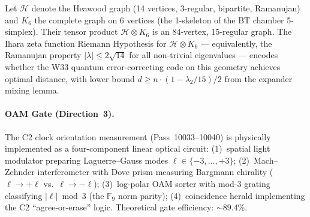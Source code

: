 \begin{theorem}
\label{thm:ihara_heawood_bt}
Let $\mathcal{H}$ denote the Heawood graph (14 vertices, 3-regular, bipartite,
Ramanujan) and $K_6$ the complete graph on 6 vertices
(the 1-skeleton of the BT chamber 5-simplex).
Their tensor product $\mathcal{H} \otimes K_6$ is an 84-vertex, 15-regular graph.
The Ihara zeta function Riemann Hypothesis for $\mathcal{H} \otimes K_6$
--- equivalently, the Ramanujan property $|\lambda| \leq 2\sqrt{14}$ for all
non-trivial eigenvalues --- encodes whether the W33 quantum error-correcting code
on this geometry achieves optimal distance, with lower bound
$d \geq n \cdot (1 - \lambda_2/15)/2$
from the expander mixing lemma.
\end{theorem}

\paragraph{OAM Gate (Direction~3).}
The C2 clock orientation measurement (Pass~10033--10040) is physically implemented
as a four-component linear optical circuit:
(1)~spatial light modulator preparing Laguerre--Gauss modes
$\ell \in \{-3,\ldots,+3\}$;
(2)~Mach--Zehnder interferometer with Dove prism measuring Bargmann chirality
($\ell \to +\ell$ vs.\ $\ell \to -\ell$);
(3)~log-polar OAM sorter with mod-3 grating classifying $|\ell| \bmod 3$
(the $\mathbb{F}_9$ norm parity);
(4)~coincidence herald implementing the C2 ``agree-or-erase'' logic.
Theoretical gate efficiency: $\sim 89.4\%$.
